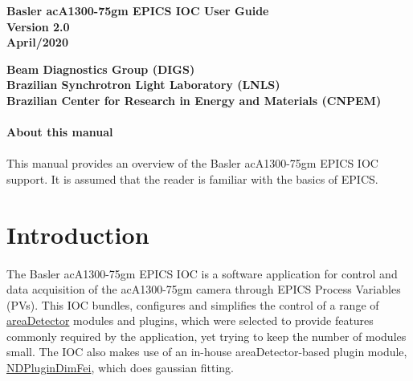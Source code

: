 \documentclass[openany]{article}
\begin{document}
\begin{titlepage}

\thispagestyle{fancy}

\begin{center}

\vspace*{\fill}
\textbf{\Huge Basler acA1300-75gm EPICS IOC User Guide}\\[20pt]
\textbf{\Huge Version 2.0}\\[20pt]
\textbf{\Huge April/2020}
\vspace*{\fill}

\vfill
\textbf{Beam Diagnostics Group (DIGS)}\\[5pt]
\textbf{Brazilian Synchrotron Light Laboratory (LNLS)}\\[5pt]
\textbf{Brazilian Center for Research in Energy and Materials (CNPEM)}
\end{center}

\end{titlepage}

\newpage
\pagestyle{plain} %

\paragraph{}{\Large\bfseries About this manual}

\paragraph{} This manual provides an overview of the Basler acA1300-75gm EPICS IOC support. It is assumed that the reader is familiar with the basics of EPICS.

\tableofcontents

\newpage
\section{Introduction}

\paragraph{} The Basler acA1300-75gm EPICS IOC is a software application for control and data acquisition of the acA1300-75gm camera through EPICS Process Variables (PVs). This IOC bundles, configures and simplifies the control of a range of \href{https://github.com/areaDetector/areaDetector}{areaDetector} modules and plugins, which were selected to provide features commonly required by the application, yet trying to keep the number of modules small. The IOC also makes use of an in-house areaDetector-based plugin module, \href{https://github.com/}{NDPluginDimFei}, which does gaussian fitting.
\end{document}
